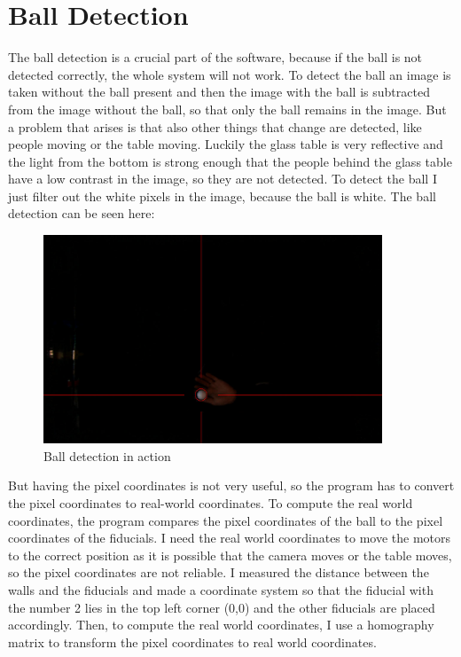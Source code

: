 

\section{Ball Detection}\label{sec:ball-detection}
The ball detection is a crucial part of the software, because if the ball is not detected correctly, the whole system will not work.
To detect the ball an image is taken without the ball present and then the image with the ball is subtracted from the image without the ball, so that only the ball remains in the image.
But a problem that arises is that also other things that change are detected, like people moving or the table moving.
Luckily the glass table is very reflective and the light from the bottom is strong enough that the people behind the glass table have a low contrast in the image, so they are not detected.
To detect the ball I just filter out the white pixels in the image, because the ball is white.
The ball detection can be seen here:
\begin{figure}[H]
    \centering
    \includegraphics[width=0.9\textwidth]{../photos/ball_detection}
    \caption[ball-detection]{Ball detection in action}
    \label{fig:ball_detection}
\end{figure}
But having the pixel coordinates is not very useful, so the program has to convert the pixel coordinates to real-world coordinates.
To compute the real world coordinates, the program compares the pixel coordinates of the ball to the pixel coordinates of the fiducials.
I need the real world coordinates to move the motors to the correct position as it is possible that the camera moves or the table moves, so the pixel coordinates are not reliable.
I measured the distance between the walls and the fiducials and made a coordinate system so that the fiducial with the number 2 lies in the top left corner (0,0) and the other fiducials are placed accordingly.
Then, to compute the real world coordinates, I use a homography\autocite{homography} matrix to transform the pixel coordinates to real world coordinates.


